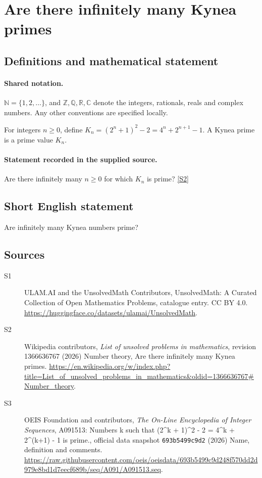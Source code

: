 \documentclass[11pt]{article}
\newcommand{\sref}[2]{\hyperlink{source:#1:#2}{[S#2]}}
\begin{document}
\section{Are there infinitely many Kynea primes}\label{statement}

\subsection{Definitions and mathematical statement}

\paragraph{Shared notation.}$\mathbb N=\{1,2,\ldots\}$, and $\mathbb Z,\mathbb Q,\mathbb R,\mathbb C$ denote the integers, rationals, reals and complex numbers. Any other conventions are specified locally.


For integers $n\ge0$, define $K_n=(2^n+1)^2-2=4^n+2^{n+1}-1$. A Kynea prime is a prime value $K_n$.
\paragraph{Statement recorded in the supplied source.}
Are there infinitely many $n\ge0$ for which $K_n$ is prime? \sref{statement}{2}
\subsection{Short English statement}
Are infinitely many Kynea numbers prime?
\subsection{Sources}
\begin{description}
\item[\hypertarget{source:statement:1}{S1}] ULAM.AI and the UnsolvedMath Contributors, UnsolvedMath: A Curated Collection of Open Mathematics Problems, catalogue entry. CC BY 4.0. \url{https://huggingface.co/datasets/ulamai/UnsolvedMath}.
\item[\hypertarget{source:statement:2}{S2}] Wikipedia contributors, \emph{List of unsolved problems in mathematics}, revision 1366636767 (2026) Number theory, Are there infinitely many Kynea primes. \url{https://en.wikipedia.org/w/index.php?title=List_of_unsolved_problems_in_mathematics&oldid=1366636767#Number_theory}.
\item[\hypertarget{source:statement:3}{S3}] OEIS Foundation and contributors, \emph{The On-Line Encyclopedia of Integer Sequences}, A091513: Numbers k such that (2\textasciicircum{}k + 1)\textasciicircum{}2 - 2 = 4\textasciicircum{}k + 2\textasciicircum{}(k+1) - 1 is prime., official data snapshot \texttt{693b5499c9d2} (2026) Name, definition and comments. \url{https://raw.githubusercontent.com/oeis/oeisdata/693b5499c9d248f570dd2d979e8bd1d7eecf689b/seq/A091/A091513.seq}.
\end{description}
\label{end:statement}
\end{document}
